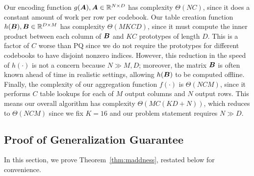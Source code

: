 Our encoding function $g(\bm{A}), \bm{A} \in \mathbb{R}^{N \times D}$ has complexity $\Theta(NC)$, since it does a constant amount of work per row per codebook. Our table creation function $h(\bm{B}), \bm{B} \in \mathbb{R}^{D \times M}$ has complexity $\Theta(MKCD)$, since it must compute the inner product between each column of $\bm{B}$ and $KC$ prototypes of length $D$. This is a factor of $C$ worse than PQ since we do not require the prototypes for different codebooks to have disjoint nonzero indices. However, this reduction in the speed of $h(\cdot)$ is not a concern because $N \gg M, D$; moreover, the matrix $\bm{B}$ is often known ahead of time in realistic settings, allowing $h(\bm{B})$ to be computed offline. Finally, the complexity of our aggregation function $f(\cdot)$ is $\Theta(NCM)$, since it performs $C$ table lookups for each of $M$ output columns and $N$ output rows. This means our overall algorithm has complexity $\Theta(MC(KD + N))$, which reduces to $\Theta(NCM)$ since we fix $K = 16$ and our problem statement requires $N \gg D$.

\subsection{Proof of Generalization Guarantee}

In this section, we prove Theorem~\ref{thm:maddness}, restated below for convenience.

